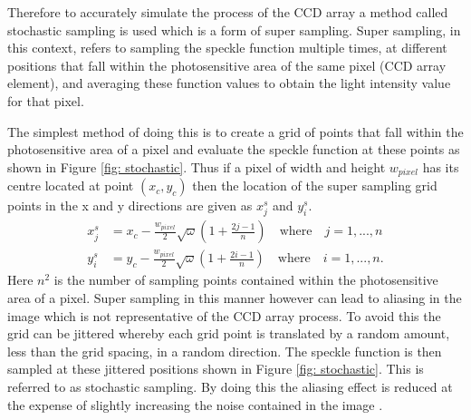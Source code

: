 \documentclass[12pt,oneside,openany,a4paper, %
english, %
masters-t, goldenblock]{usthesis}
\begin{document}
Therefore to accurately simulate the process of the CCD array a method called stochastic sampling  is used which is a form of super sampling. Super sampling, in this context, refers to sampling the speckle function multiple times, at different positions that fall within the photosensitive area of the same pixel (CCD array element), and averaging these function values to obtain the light intensity value for that pixel. 

The simplest method of doing this is to create a grid of points that fall within the photosensitive area of a pixel and evaluate the speckle function at these points as shown in Figure \ref{fig: stochastic}. Thus if a pixel of width and height $w_{pixel}$ has its centre located at point $(x_c,y_c)$ then the location of the super sampling grid points in the x and y directions are given as $x_j^s$ and $y_i^s$.
\begin{align}
  x_j^s &= x_c-\frac{w_{pixel}}{2} \sqrt{\omega} \left( 1+\frac{2j-1}{n} \right) \quad \text{where} \quad j=1,...,n \\
  y_i^s &= y_c-\frac{w_{pixel}}{2} \sqrt{\omega} \left( 1+\frac{2i-1}{n} \right) \quad \text{where} \quad i=1,...,n.
\end{align}
Here $n^2$ is the number of sampling points contained within the photosensitive area of a pixel. Super sampling in this manner however can lead to aliasing in the image which is not representative of the CCD array process. To avoid this the grid can be jittered whereby each grid point is translated by a random amount, less than the grid spacing, in a random direction. The speckle function is then sampled at these jittered positions shown in Figure \ref{fig: stochastic}. This is referred to as stochastic sampling. By doing this the aliasing effect is reduced at the expense of slightly increasing the noise contained in the image \cite{beets2000super}.





\end{document}

